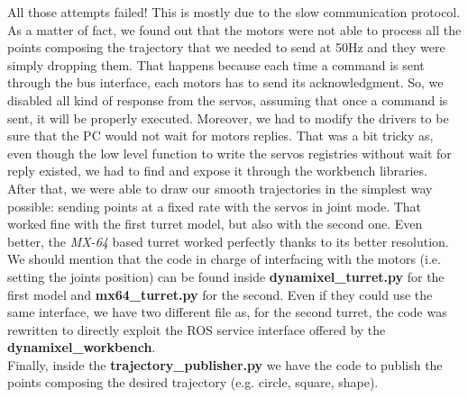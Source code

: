 All those attempts failed! This is mostly due to the slow communication protocol. As a matter of fact, we found out that the motors were not able to process all the points composing the trajectory that we needed to send at 50Hz and they were simply dropping them. That happens because each time a command is sent through the bus interface, each motors has to send its acknowledgment. So, we disabled all kind of response from the servos, assuming that once a command is sent, it will be properly executed. Moreover, we had to modify the drivers to be sure that the PC would not wait for motors replies. That was a bit tricky as, even though the low level function to write the servos registries without wait for reply existed, we had to find and expose it through the workbench libraries.\\
After that, we were able to draw our smooth trajectories in the simplest way possible: sending points at a fixed rate with the servos in joint mode. That worked fine with the first turret model, but also with the second one. Even better, the \emph{MX-64} based turret worked perfectly thanks to its better resolution.\\

We should mention that the code in charge of interfacing with the motors (i.e. setting the joints position) can be found inside \textbf{dynamixel\_turret.py} for the first model and \textbf{mx64\_turret.py} for the second. Even if they could use the same interface, we have two different file as, for the second turret, the code was rewritten to directly exploit the ROS service interface offered by the \textbf{dynamixel\_workbench}.\\
Finally, inside the \textbf{trajectory\_publisher.py} we have the code to publish the points composing the desired trajectory (e.g. circle, square, \virgolette{$\infty$} shape). 